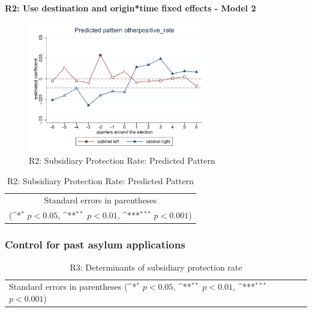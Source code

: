 \documentclass[10pt,a4paper]{scrartcl}
\begin{document}
\clearpage
\textbf{R2: Use destination and origin*time fixed effects - Model 2}
\begin{figure}[!ht]
	\centering
	\includegraphics[width=0.7\textwidth]{figures_edited/otherpositive_rate_graph2_R2.pdf}
	\caption{R2: Subsidiary Protection Rate: Predicted Pattern}
\end{figure}

\begin{table}[!ht]\centering
	\footnotesize
	\renewcommand{\arraystretch}{1.2}
	\def\sym#1{\ifmmode^{#1}\else\(^{#1}\)\fi}
	\caption{R2: Subsidiary Protection Rate: Predicted Pattern}
	\begin{tabular}{l*{2}{c}}
		\hline\hline
		
		\hline\hline
		\multicolumn{3}{c}{\footnotesize Standard errors in parentheses} \\
		\multicolumn{3}{c}{\footnotesize (\sym{*} \(p<0.05\), \sym{**} \(p<0.01\), \sym{***} \(p<0.001\))}\\
	\end{tabular}
\end{table}




\clearpage
\FloatBarrier
\subsubsection{Control for past asylum applications}
\begin{table}[!ht]\centering
	\renewcommand{\arraystretch}{1.25}
	\small
	\def\sym#1{\ifmmode^{#1}\else\(^{#1}\)\fi}
	\caption{R3: Determinants of subsidiary protection rate}
	\begin{tabular}{l*{3}{c}}
		\hline\hline
		
		\hline\hline
		\multicolumn{4}{l}{\footnotesize Standard errors in parentheses (\sym{*} \(p<0.05\), \sym{**} \(p<0.01\), \sym{***} \(p<0.001\))}\\
	\end{tabular}
\end{table}
\end{document}
